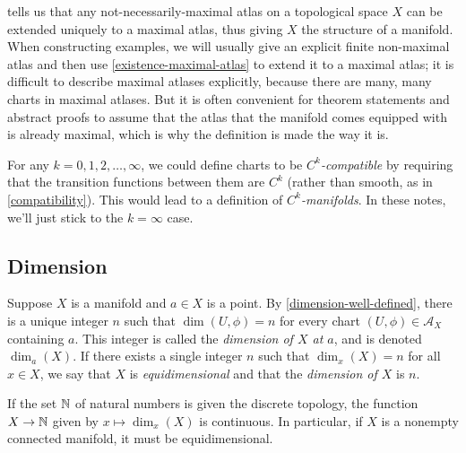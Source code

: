  tells us that any not-necessarily-maximal atlas on a topological space $X$ can be extended uniquely to a maximal atlas, thus giving $X$ the structure of a manifold. When constructing examples, we will usually give an explicit finite non-maximal atlas and then use \cref{existence-maximal-atlas} to extend it to a maximal atlas; it is difficult to describe maximal atlases explicitly, because there are many, many charts in maximal atlases. But it is often convenient for theorem statements and abstract proofs to assume that the atlas that the manifold comes equipped with is already maximal, which is why the definition is made the way it is.

\begin{unimportantremark}
	For any $k = 0, 1, 2, \dotsc, \infty$, we could define charts to be \emph{$C^k$-compatible} by requiring that the transition functions between them are $C^k$ (rather than smooth, as in \cref{compatibility}). This would lead to a definition of \emph{$C^k$-manifolds}. In these notes, we'll just stick to the $k = \infty$ case.  
\end{unimportantremark}

\subsection{Dimension}

\begin{definition}[Dimension] 
	Suppose $X$ is a manifold and $a \in X$ is a point. By \cref{dimension-well-defined}, there is a unique integer $n$ such that $\dim(U,\phi) = n$ for every chart $(U, \phi) \in \mathscr{A}_X$ containing $a$. This integer is called the \emph{dimension of $X$ at $a$}, and is denoted $\dim_a(X)$. If there exists a single integer $n$ such that $\dim_x(X) = n$ for all $x \in X$, we say that $X$ is \emph{equidimensional} and that the \emph{dimension of $X$} is $n$. 
\end{definition}

\begin{proposition}
	If the set $\mathbb{N}$ of natural numbers is given the discrete topology, the function $X \to \mathbb{N}$ given by $x \mapsto \dim_x(X)$ is continuous. In particular, if $X$ is a nonempty connected manifold, it must be equidimensional. 
\end{proposition}


